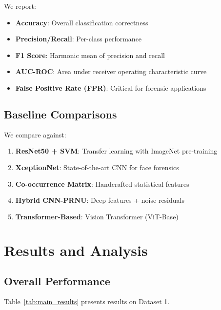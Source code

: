 \documentclass[runningheads]{llncs}
\begin{document}
We report:
\begin{itemize}
    \item \textbf{Accuracy}: Overall classification correctness
    \item \textbf{Precision/Recall}: Per-class performance
    \item \textbf{F1 Score}: Harmonic mean of precision and recall
    \item \textbf{AUC-ROC}: Area under receiver operating characteristic curve
    \item \textbf{False Positive Rate (FPR)}: Critical for forensic applications
\end{itemize}

\subsection{Baseline Comparisons}

We compare against:
\begin{enumerate}
    \item \textbf{ResNet50 + SVM}: Transfer learning with ImageNet pre-training
    \item \textbf{XceptionNet}: State-of-the-art CNN for face forensics
    \item \textbf{Co-occurrence Matrix}: Handcrafted statistical features
    \item \textbf{Hybrid CNN-PRNU}: Deep features + noise residuals
    \item \textbf{Transformer-Based}: Vision Transformer (ViT-Base)
\end{enumerate}

\section{Results and Analysis}
\label{sec:results}

\subsection{Overall Performance}

Table~\ref{tab:main_results} presents results on Dataset 1.
\end{document}
